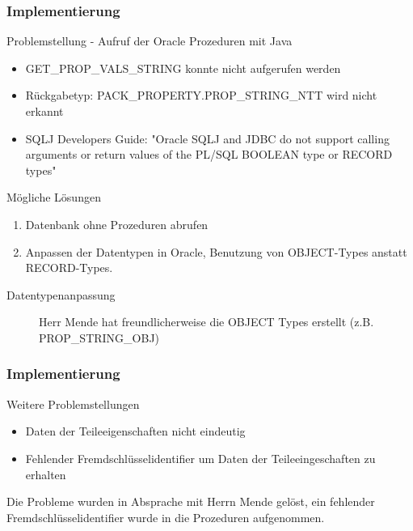 \documentclass[serif,mathserif]{beamer}
\begin{document}
\begin{frame}
  \frametitle{Implementierung}
  Problemstellung - Aufruf der Oracle Prozeduren mit Java
  \begin{itemize}
  \item GET\_PROP\_VALS\_STRING konnte nicht aufgerufen werden
  \item Rückgabetyp: PACK\_PROPERTY.PROP\_STRING\_NTT wird nicht erkannt
  \item SQLJ Developers Guide: "Oracle SQLJ and JDBC do not support calling arguments or return values of the PL/SQL BOOLEAN type or RECORD types"
  \end{itemize}
  
  Mögliche Lösungen
   \begin{enumerate}
  \item Datenbank ohne Prozeduren abrufen
  \item Anpassen der Datentypen in Oracle, Benutzung von OBJECT-Types anstatt RECORD-Types.
  \end{enumerate}
  
  \begin{description}
\item[Datentypenanpassung] Herr Mende hat freundlicherweise die OBJECT Types erstellt (z.B. PROP\_STRING\_OBJ)
\end{description}

\end{frame}

\begin{frame}
  \frametitle{Implementierung}
 Weitere Problemstellungen
  \begin{itemize}
  \item Daten der Teileeigenschaften nicht eindeutig
  \item Fehlender Fremdschlüsselidentifier um Daten der Teileeingeschaften zu erhalten
  \end{itemize}
  
 Die Probleme wurden in Absprache mit Herrn Mende gelöst, ein fehlender Fremdschlüsselidentifier wurde in die Prozeduren aufgenommen. 
  
\end{frame}
\end{document}
